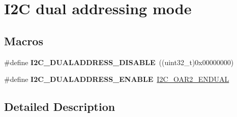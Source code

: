 \hypertarget{group___i2_c__dual__addressing__mode}{\section{I2\-C dual addressing mode}
\label{group___i2_c__dual__addressing__mode}
}
\subsection*{Macros}
\begin{DoxyCompactItemize}
\item 
\hypertarget{group___i2_c__dual__addressing__mode_gacb8f4a1fd543e5ef2c9e7711fc9b5a67}{\#define {\bfseries I2\-C\-\_\-\-D\-U\-A\-L\-A\-D\-D\-R\-E\-S\-S\-\_\-\-D\-I\-S\-A\-B\-L\-E}~((uint32\-\_\-t)0x00000000)}\label{group___i2_c__dual__addressing__mode_gacb8f4a1fd543e5ef2c9e7711fc9b5a67}

\item 
\hypertarget{group___i2_c__dual__addressing__mode_gae33ff5305d9f38d857cff1774f481fab}{\#define {\bfseries I2\-C\-\_\-\-D\-U\-A\-L\-A\-D\-D\-R\-E\-S\-S\-\_\-\-E\-N\-A\-B\-L\-E}~\hyperlink{group___peripheral___registers___bits___definition_gab83ed1ee64439cb2734a708445f37e94}{I2\-C\-\_\-\-O\-A\-R2\-\_\-\-E\-N\-D\-U\-A\-L}}\label{group___i2_c__dual__addressing__mode_gae33ff5305d9f38d857cff1774f481fab}

\end{DoxyCompactItemize}


\subsection{Detailed Description}
